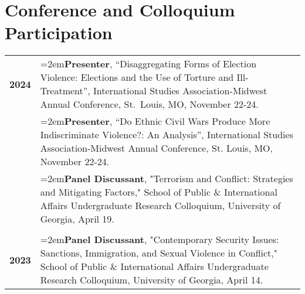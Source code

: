 \documentclass[letterpaper,12pt]{article}
\begin{document}
\section{Conference and Colloquium Participation}
\begin{xltabular}{\dimexpr\textwidth-0in}{p{.85in}X}
\textbf{2024} & \hangindent=2em\textbf{Presenter}, ``Disaggregating Forms of Election Violence: Elections and the Use of \mbox{Torture} and Ill-Treatment”, International Studies Association-Midwest Annual Conference, \mbox{St. Louis}, MO, November 22-24.\\
                     & \hangindent=2em\textbf{Presenter}, ``Do Ethnic Civil Wars Produce More Indiscriminate Violence?: An \mbox{Analysis}”, International Studies Association-Midwest Annual Conference, St. Louis, MO, \mbox{November} 22-24.\\
                     & \hangindent=2em\textbf{Panel Discussant}, "Terrorism and Conflict: Strategies and Mitigating Factors," School of Public \& International Affairs Undergraduate Research Colloquium, University of Georgia, April 19.\\  \\
\textbf{2023} &  \hangindent=2em\textbf{Panel Discussant}, "Contemporary Security Issues: Sanctions, Immigration, and \mbox{Sexual} \mbox{Violence} in Conflict," School of Public \& International Affairs Undergraduate \mbox{Research} \mbox{Colloquium,} University of Georgia, April 14.\\ 
\end{xltabular}

\end{document}
